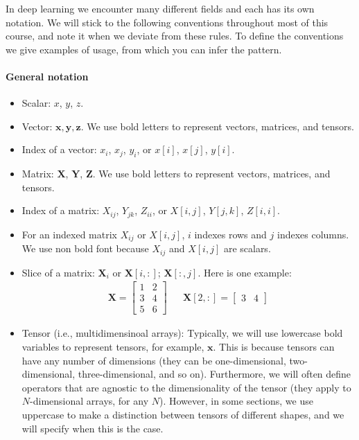 \documentclass[12pt,letterpaper]{article}
\begin{document}
\newcommand{\xin}{\mathbf{x}_{\texttt{in}}}
\newcommand{\xout}{\mathbf{x}_{\texttt{out}}}
\newcommand{\xini}{x_{\texttt{in}_i}}
\newcommand{\xouti}{x_{\texttt{out}_i}}
\newcommand{\xink}{x_{\texttt{in}_k}}

In deep learning we encounter many different fields and each has its own notation. We will stick to the following conventions throughout most of this course, and note it when we deviate from these rules. To define the conventions we give examples of usage, from which you can infer the pattern.

\paragraph{General notation}
\begin{itemize}
\item Scalar: $x$, $y$, $z$.
\item Vector: $\mathbf{x}, \mathbf{y}, \mathbf{z}$. We use bold letters to represent vectors, matrices, and tensors.
\item Index of a vector: $x_i$, $x_j$, $y_i$, or $x[i]$, $x[j]$, $y[i]$.
\item Matrix: $\mathbf{X}$, $\mathbf{Y}$, $\mathbf{Z}$. We use bold letters to represent vectors, matrices, and tensors.
\item Index of a matrix: $X_{ij}$, $Y_{jk}$, $Z_{ii}$, or $X[i,j]$, $Y[j,k]$, $Z[i,i]$.
\item For an indexed matrix $X_{ij}$ or $X[i,j]$, $i$ indexes rows and $j$ indexes columns. We use non bold font because $X_{ij}$ and $X[i,j]$ are scalars.
\item Slice of a matrix: $\mathbf{X}_i$ or $\mathbf{X}[i,:]$; $\mathbf{X}[:,j]$. Here is one example:
\begin{align*}
\mathbf{X} = 
\begin{bmatrix}
    1 & 2 \\
    3 & 4 \\
    5 & 6
\end{bmatrix}
&&
\mathbf{X}[2,:] = 
\begin{bmatrix}
    3 & 4
\end{bmatrix}
\end{align*}
\item Tensor (i.e., multidimensinoal arrays): Typically, we will use lowercase bold variables to represent tensors, for example, $\mathbf{x}$. This is because tensors can have any number of dimensions (they can be one-dimensional, two-dimensional, three-dimensional, and so on). Furthermore, we will often define operators that are agnostic to the dimensionality of the tensor (they apply to $N$-dimensional arrays, for any $N$). However, in some sections, we use uppercase to make a distinction between tensors of different shapes, and we will specify when this is the case. 

\end{itemize}
\end{document}
